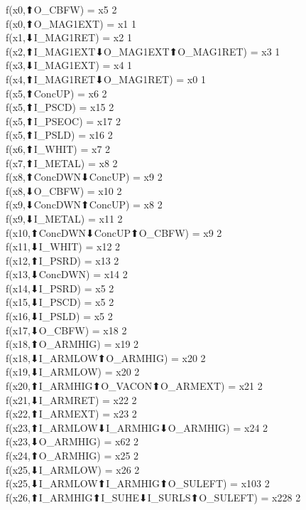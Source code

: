 f(x0,⬆O_CBFW) = x5 {2} \\
f(x0,⬆O_MAG1EXT) = x1 {1} \\
f(x1,⬇I_MAG1RET) = x2 {1} \\
f(x2,⬆I_MAG1EXT⬇O_MAG1EXT⬆O_MAG1RET) = x3 {1} \\
f(x3,⬇I_MAG1EXT) = x4 {1} \\
f(x4,⬆I_MAG1RET⬇O_MAG1RET) = x0 {1} \\
f(x5,⬆ConcUP) = x6 {2} \\
f(x5,⬆I_PSCD) = x15 {2} \\
f(x5,⬆I_PSEOC) = x17 {2} \\
f(x5,⬆I_PSLD) = x16 {2} \\
f(x6,⬆I_WHIT) = x7 {2} \\
f(x7,⬆I_METAL) = x8 {2} \\
f(x8,⬆ConcDWN⬇ConcUP) = x9 {2} \\
f(x8,⬇O_CBFW) = x10 {2} \\
f(x9,⬇ConcDWN⬆ConcUP) = x8 {2} \\
f(x9,⬇I_METAL) = x11 {2} \\
f(x10,⬆ConcDWN⬇ConcUP⬆O_CBFW) = x9 {2} \\
f(x11,⬇I_WHIT) = x12 {2} \\
f(x12,⬆I_PSRD) = x13 {2} \\
f(x13,⬇ConcDWN) = x14 {2} \\
f(x14,⬇I_PSRD) = x5 {2} \\
f(x15,⬇I_PSCD) = x5 {2} \\
f(x16,⬇I_PSLD) = x5 {2} \\
f(x17,⬇O_CBFW) = x18 {2} \\
f(x18,⬆O_ARMHIG) = x19 {2} \\
f(x18,⬇I_ARMLOW⬆O_ARMHIG) = x20 {2} \\
f(x19,⬇I_ARMLOW) = x20 {2} \\
f(x20,⬆I_ARMHIG⬆O_VACON⬆O_ARMEXT) = x21 {2} \\
f(x21,⬇I_ARMRET) = x22 {2} \\
f(x22,⬆I_ARMEXT) = x23 {2} \\
f(x23,⬆I_ARMLOW⬇I_ARMHIG⬇O_ARMHIG) = x24 {2} \\
f(x23,⬇O_ARMHIG) = x62 {2} \\
f(x24,⬆O_ARMHIG) = x25 {2} \\
f(x25,⬇I_ARMLOW) = x26 {2} \\
f(x25,⬇I_ARMLOW⬆I_ARMHIG⬆O_SULEFT) = x103 {2} \\
f(x26,⬆I_ARMHIG⬆I_SUHE⬇I_SURLS⬆O_SULEFT) = x228 {2} \\
